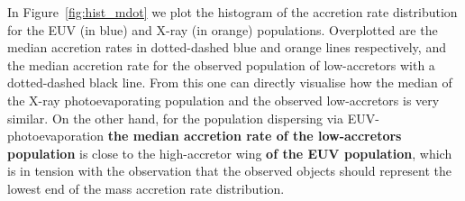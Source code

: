 \documentclass[fleqn,usenatbib]{mnras}
\begin{document}

In Figure~\ref{fig:hist_mdot} we plot the histogram of the accretion rate distribution for the EUV (in blue) and X-ray (in orange) populations. Overplotted are the median accretion rates in dotted-dashed blue and orange lines respectively, and the median accretion rate for the observed population of low-accretors with a dotted-dashed black line. From this one can directly visualise how the median of the X-ray photoevaporating population and the observed low-accretors is very similar. On the other hand, for the population dispersing via EUV-photoevaporation {\bf the median accretion rate of the low-accretors population} is close to the high-accretor wing {\bf of the EUV population}, which is in tension with the observation that the observed objects should represent the lowest end of the mass accretion rate distribution.
\end{document}
